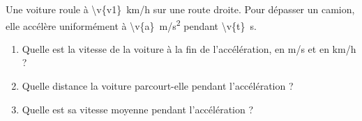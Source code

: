 Une voiture roule à \qty{\v{v1}}{km/h} sur une route droite. Pour dépasser un camion, elle accélère uniformément à \qty{\v{a}}{m/s^2} pendant \qty{\v{t}}{s}.

\begin{enumerate}[label=\alph*)]
    \item Quelle est la vitesse de la voiture à la fin de l'accélération, en m/s et en km/h ?
    \item Quelle distance la voiture parcourt-elle pendant l'accélération ?
    \item Quelle est sa vitesse moyenne pendant l'accélération ?
\end{enumerate}
